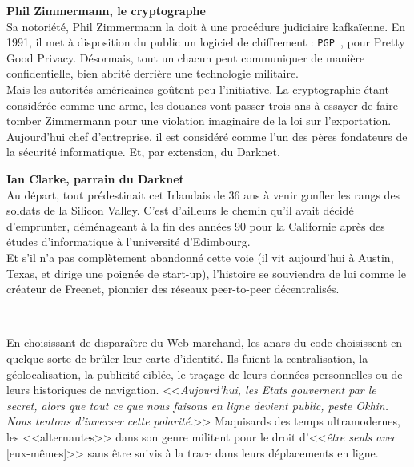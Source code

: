 \documentclass[11pt,twoside,a4paper]{article}
\begin{document}
\colorbox{verylightgray}{%
	\begin{minipage}{0.475\textwidth}
		\footnotesize
		\textbf{\large Phil Zimmermann, le cryptographe}~\\

		Sa notori{\'e}t{\'e}, Phil Zimmermann la doit {\`a} une proc{\'e}dure judiciaire kafka{\"i}enne. En 1991, il met {\`a} disposition du public un logiciel de chiffrement : \texttt{PGP~\footnotemark }, pour Pretty Good Privacy. D{\'e}sormais, tout un chacun peut communiquer de mani{\`e}re confidentielle, bien abrit{\'e} derri{\`e}re une technologie militaire. ~\\

		Mais les autorit{\'e}s am{\'e}ricaines go{\^u}tent peu l'initiative. La cryptographie {\'e}tant consid{\'e}r{\'e}e comme une arme, les douanes vont passer trois ans {\`a} essayer de faire tomber Zimmermann pour une violation imaginaire de la loi sur l'exportation. Aujourd'hui chef d'entreprise, il est consid{\'e}r{\'e} comme l'un des p{\`e}res fondateurs de la s{\'e}curit{\'e} informatique. Et, par extension, du Darknet. %
	\end{minipage}%
} \hfill \colorbox{verylightgray}{%
	\begin{minipage}{0.475\textwidth}
		\footnotesize
		\textbf{\large Ian Clarke, parrain du Darknet}~\\
		
		Au d{\'e}part, tout pr{\'e}destinait cet Irlandais de 36 ans {\`a} venir gonfler les rangs des soldats de la Silicon Valley. C'est d'ailleurs le chemin qu'il avait d{\'e}cid{\'e} d'emprunter, d{\'e}m{\'e}nageant {\`a} la fin des ann{\'e}es 90 pour la Californie apr{\`e}s des {\'e}tudes d'informatique {\`a} l'universit{\'e} d'Edimbourg. ~\\
		
		Et s'il n'a pas compl{\`e}tement abandonn{\'e} cette voie (il vit aujourd'hui {\`a} Austin, Texas, et dirige une poign{\'e}e de start-up), l'histoire se souviendra de lui comme le cr{\'e}ateur de Freenet, pionnier des r{\'e}seaux peer-to-peer d{\'e}centralis{\'e}s. %
	\end{minipage}%
} ~\\

En choisissant de dispara{\^i}tre du Web marchand, les anars du code choisissent en quelque sorte de br{\^u}ler leur carte d'identit{\'e}. Ils fuient la centralisation, la g{\'e}olocalisation, la publicit{\'e} cibl{\'e}e, le tra\c{c}age de leurs donn{\'e}es personnelles ou de leurs historiques de navigation. <<\emph{Aujourd'hui, les Etats gouvernent par le secret, alors que tout ce que nous faisons en ligne devient public, peste Okhin. Nous tentons d'inverser cette polarit{\'e}.}>> Maquisards des temps ultramodernes, les <<alternautes>> dans son genre militent pour le droit d'<<\emph{{\^e}tre seuls avec }[eux-m{\^e}mes]>> sans {\^e}tre suivis {\`a} la trace dans leurs d{\'e}placements en ligne. ~\\
\end{document}
